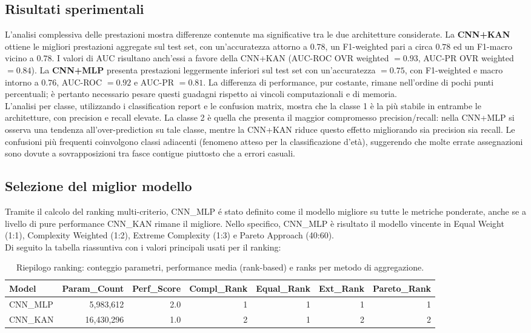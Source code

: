 \documentclass[a4paper,12pt]{report}
\begin{document}
	\subsection{Risultati sperimentali}
	
	L'analisi complessiva delle prestazioni mostra differenze contenute ma significative tra le due architetture considerate. La \textbf{CNN+KAN} ottiene le migliori prestazioni aggregate sul test set, con un'accuratezza attorno a $0.78$, un F1-weighted pari a circa $0.78$ ed un F1-macro vicino a $0.78$. I valori di AUC risultano anch'essi a favore della CNN+KAN (AUC-ROC OVR weighted $= 0.93$, AUC-PR OVR weighted $= 0.84$). La \textbf{CNN+MLP} presenta prestazioni leggermente inferiori sul test set con un'accuratezza $= 0.75$, con F1-weighted e macro intorno a $0.76$, AUC-ROC $= 0.92$ e AUC-PR $= 0.81$. La differenza di performance, pur costante, rimane nell'ordine di pochi punti percentuali; è pertanto necessario pesare questi guadagni rispetto ai vincoli computazionali e di memoria. \\
	L'analisi per classe, utilizzando i classification report e le confusion matrix, mostra che la classe 1 è la più stabile in entrambe le architetture, con precision e recall elevate. La classe 2 è quella che presenta il maggior compromesso precision/recall: nella CNN+MLP si osserva una tendenza all'over-prediction su tale classe, mentre la CNN+KAN riduce questo effetto migliorando sia precision sia recall. Le confusioni più frequenti coinvolgono classi adiacenti (fenomeno atteso per la classificazione d'età), suggerendo che molte errate assegnazioni sono dovute a sovrapposizioni tra fasce contigue piuttosto che a errori casuali. \\
	
	\subsection{Selezione del miglior modello}
	Tramite il calcolo del ranking multi-criterio, CNN\_MLP é stato definito come il modello migliore su tutte le metriche ponderate, anche se a livello di pure performance CNN\_KAN rimane il migliore. Nello specifico, CNN\_MLP è risultato il modello vincente in Equal Weight (1:1), Complexity Weighted (1:2), Extreme Complexity (1:3) e Pareto Approach (40:60). \\
	Di seguito la tabella riassuntiva con i valori principali usati per il ranking:
	
	\begin{table}[H]
		\centering
		\setlength{\tabcolsep}{2pt}
		\caption{Riepilogo ranking: conteggio parametri, performance media (rank-based) e ranks per metodo di aggregazione.}
		\begin{tabular}{lrrrrrr}
			\toprule
			\textbf{Model} & \textbf{Param\_Count} & \textbf{Perf\_Score} & \textbf{Compl\_Rank} & \textbf{Equal\_Rank} & \textbf{Ext\_Rank} & \textbf{Pareto\_Rank} \\
			\midrule
			CNN\_MLP & 5,983,612 & 2.0 & 1 & 1 & 1 & 1 \\
			CNN\_KAN & 16,430,296 & 1.0 & 2 & 1 & 2 & 2 \\
			\bottomrule
		\end{tabular}
	\end{table}
	
\end{document}
